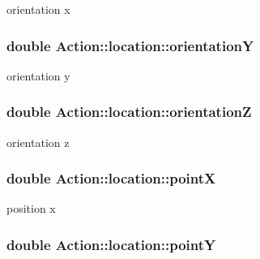 orientation x 

\hypertarget{structAction_1_1location_aab40c1aea8f1b3614bd1cc379c24fef6}{
\subsubsection[{orientation\-Y}]{\setlength{\rightskip}{0pt plus 5cm}double Action\-::location\-::orientation\-Y}}\label{structAction_1_1location_aab40c1aea8f1b3614bd1cc379c24fef6}


orientation y 

\hypertarget{structAction_1_1location_a9b6f1a2418c92521a96efa388f5b0c70}{
\subsubsection[{orientation\-Z}]{\setlength{\rightskip}{0pt plus 5cm}double Action\-::location\-::orientation\-Z}}\label{structAction_1_1location_a9b6f1a2418c92521a96efa388f5b0c70}


orientation z 

\hypertarget{structAction_1_1location_aa8df7e1f54d12a455af659f1c6443e0c}{
\subsubsection[{point\-X}]{\setlength{\rightskip}{0pt plus 5cm}double Action\-::location\-::point\-X}}\label{structAction_1_1location_aa8df7e1f54d12a455af659f1c6443e0c}


position x 

\hypertarget{structAction_1_1location_a0146e2b44bd7e2495234fa17cc6f1f6f}{
\subsubsection[{point\-Y}]{\setlength{\rightskip}{0pt plus 5cm}double Action\-::location\-::point\-Y}}\label{structAction_1_1location_a0146e2b44bd7e2495234fa17cc6f1f6f}


